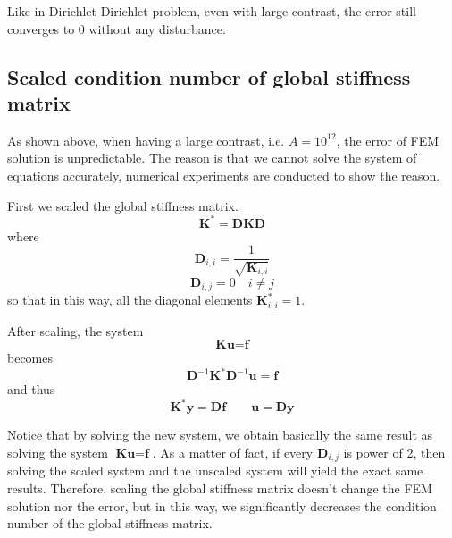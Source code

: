 \documentclass[12pt]{article}
\begin{document}
Like in Dirichlet-Dirichlet problem, even with large contrast, the error still converges to $0$ without any disturbance.

\subsection{Scaled condition number of global stiffness matrix}
As shown above, when having a large contrast, i.e. $A=10^{12}$, the error of FEM solution is unpredictable. The reason is that we cannot solve the system of equations accurately, numerical experiments are conducted to show the reason.

First we scaled the global stiffness matrix.
$$\textbf{K}^{*}=\textbf{DKD}$$
where
$$\textbf{D}_{i,i}=\frac{1}{\sqrt{\textbf{K}_{i,i}}} $$
$$\textbf{D}_{i,j}=0 \quad i \neq j$$
so that in this way, all the diagonal elements $\textbf{K}^{*}_{i,i}=1$.

After scaling, the system
$$\textbf{Ku}=\textbf{f}$$
becomes
$$\textbf{D}^{-1}\textbf{K}^{*}\textbf{D}^{-1}\textbf{u}=\textbf{f}$$
and thus
$$\textbf{K}^{*}\textbf{y}=\textbf{Df} \quad \quad \textbf{u}=\textbf{Dy}$$

Notice that by solving the new system, we obtain basically the same result as solving the system $\textbf{Ku}=\textbf{f}$. As a matter of fact, if every $\textbf{D}_{i,j}$ is power of 2, then solving the scaled system and the unscaled system will yield the exact same results. Therefore, scaling the global stiffness matrix doesn't change the FEM solution nor the error, but in this way, we significantly decreases the condition number of the global stiffness matrix.
\end{document}
